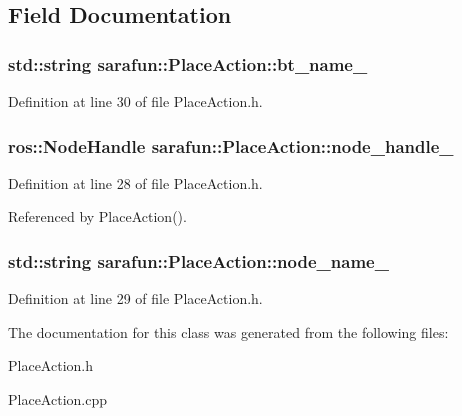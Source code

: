 \subsection{Field Documentation}
\hypertarget{classsarafun_1_1PlaceAction_aa477ccd7678ea126e43f3a586be7d72d_aa477ccd7678ea126e43f3a586be7d72d}{
\subsubsection[{bt\-\_\-name\-\_\-}]{\setlength{\rightskip}{0pt plus 5cm}std\-::string sarafun\-::\-Place\-Action\-::bt\-\_\-name\-\_\-\hspace{0.3cm}{\ttfamily [private]}}}\label{classsarafun_1_1PlaceAction_aa477ccd7678ea126e43f3a586be7d72d_aa477ccd7678ea126e43f3a586be7d72d}


Definition at line 30 of file Place\-Action.\-h.

\hypertarget{classsarafun_1_1PlaceAction_a23f95c7612c9ebb2a64dcfa6ddbd9ec2_a23f95c7612c9ebb2a64dcfa6ddbd9ec2}{
\subsubsection[{node\-\_\-handle\-\_\-}]{\setlength{\rightskip}{0pt plus 5cm}ros\-::\-Node\-Handle sarafun\-::\-Place\-Action\-::node\-\_\-handle\-\_\-\hspace{0.3cm}{\ttfamily [private]}}}\label{classsarafun_1_1PlaceAction_a23f95c7612c9ebb2a64dcfa6ddbd9ec2_a23f95c7612c9ebb2a64dcfa6ddbd9ec2}


Definition at line 28 of file Place\-Action.\-h.



Referenced by Place\-Action().

\hypertarget{classsarafun_1_1PlaceAction_ae8cc4bc053661bae5bdf93a08eaf3416_ae8cc4bc053661bae5bdf93a08eaf3416}{
\subsubsection[{node\-\_\-name\-\_\-}]{\setlength{\rightskip}{0pt plus 5cm}std\-::string sarafun\-::\-Place\-Action\-::node\-\_\-name\-\_\-\hspace{0.3cm}{\ttfamily [private]}}}\label{classsarafun_1_1PlaceAction_ae8cc4bc053661bae5bdf93a08eaf3416_ae8cc4bc053661bae5bdf93a08eaf3416}


Definition at line 29 of file Place\-Action.\-h.



The documentation for this class was generated from the following files\-:\begin{DoxyCompactItemize}
\item 
Place\-Action.\-h\item 
Place\-Action.\-cpp\end{DoxyCompactItemize}
